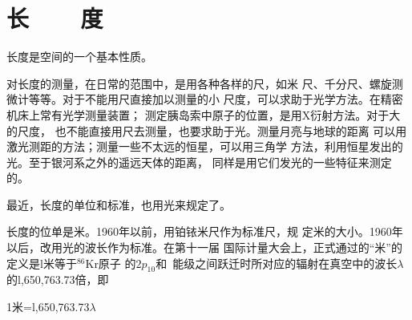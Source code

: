 \section[长度]{长~~~~度}
\label{sec:01.03}
长度是空间的一个基本性质。

对长度的测量，在日常的范围中，是用各种各样的尺，如米
尺、千分尺、螺旋测微计等等。对于不能用尺直接加以测量的小
尺度，可以求助于光学方法。在精密机床上常有光学测量装置；
测定胰岛索中原子的位置，是用X衍射方法。对于大的尺度，
也不能直接用尺去测量，也要求助于光。测量月亮与地球的距离
可以用激光测距的方法；测量一些不太远的恒星，可以用三角学
方法，利用恒星发出的光。至于银河系之外的遥远天体的距离，
同样是用它们发光的一些特征来测定的。

最近，长度的单位和标准，也用光来规定了。

长度的位单是米。1960年以前，用铂铱米尺作为标准尺，规
定米的大小。1960年以后，改用光的波长作为标准。在第十一届
国际计量大会上，正式通过的“米”的定义是l米等于$^{86}$Kr原子
的$2p_{10}$和~能级之间跃迁时所对应的辐射在真空中的波长$\lambda$的l,650,763.73倍，即

\centerline{1米=l,650,763.73$\lambda$}

